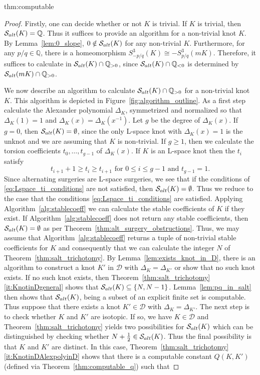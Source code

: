 \documentclass{amsart} %
\newcommand{\D}{\mathcal{D}}
\newcommand{\Q}{\mathbb{Q}}
\newcommand{\Salt}{\mathcal{S}_{\rm alt}}
\theoremstyle{thm}
\theoremstyle{definition}
\numberwithin{equation}{section}
\begin{document}
\begin{repthm}{thm:computable}
   \thmcomputable
\end{repthm}
\begin{proof}
Firstly, one can decide whether or not $K$ is trivial. If $K$ is trivial, then $\Salt(K)=\Q$. Thus it suffices to provide an algorithm for a non-trivial knot $K$. By Lemma~\ref{lem:0_slope}, $0\notin \Salt(K)$ for any non-trivial $K$. Furthermore, for any $p/q\in \Q$, there is a homeomorphism $S_{-p/q}^3(K)\cong -S_{p/q}^3(mK)$. Therefore, it suffices to calculate in $\Salt(K)\cap \Q_{>0}$, since $\Salt(K)\cap \Q_{<0}$ is determined by $\Salt(mK)\cap \Q_{>0}$.

 We now describe an algorithm to calculate $\Salt(K)\cap \Q_{>0}$ for a non-trivial knot $K$. This algorithm is depicted in Figure~\ref{fig:algorithm_outline}. As a first step calculate the Alexander polynomial $\Delta_K$, symmetrized and normalized so that $\Delta_K(1)=1$ and $\Delta_K(x)=\Delta_K(x^{-1})$. Let $g$ be the degree of $\Delta_K(x)$. If $g=0$, then $\Salt(K)=\emptyset$, since the only L-space knot with $\Delta_K(x)=1$ is the unknot and we are assuming that $K$ is non-trivial. If $g\geq 1$, then we calculate the torsion coefficients $t_0, \dots, t_{g-1}$ of $\Delta_K(x)$. If $K$ is an L-space knot then the $t_i$ satisfy
 \begin{equation}\label{eq:Lspace_ti_conditions}
     \text{$t_{i+1}+ 1\geq t_i\geq t_{i+1}$ for $0\leq i\leq g-1$ and $t_{g-1}=1$}.
 \end{equation}
 Since alternating surgeries are L-space surgeries, we see that if the conditions of \eqref{eq:Lspace_ti_conditions} are not satisfied, then $\Salt(K)=\emptyset$. Thus we reduce to the case that the conditions \eqref{eq:Lspace_ti_conditions} are satisfied. Applying Algorithm~\ref{alg:stablecoeff} we can calculate the stable coefficients of $K$ if they exist. If Algorithm~\ref{alg:stablecoeff} does not return any stable coefficients, then $\Salt(K)=\emptyset$ as per Theorem~\ref{thm:alt_surgery_obstructions}. Thus, we may assume that Algorithm~\ref{alg:stablecoeff} returns a tuple of non-trivial stable coefficients for $K$ and consequently that we can calculate the integer $N$ of Theorem~\ref{thm:salt_trichotomy}. By Lemma~\ref{lem:exists_knot_in_D}, there is an algorithm to construct a knot $K'$ in $\D$ with $\Delta_K=\Delta_{K'}$ or show that no such knot exists. If no such knot exists, then Theorem~\ref{thm:salt_trichotomy}\eqref{it:KnotinDgeneral} shows that $\Salt(K)\subseteq\{N,N-1\}$. Lemma~\ref{lem:pq_in_salt} then shows that $\Salt(K)$, being a subset of an explicit finite set is computable. Thus suppose that there exists a knot $K'\in \D$ with $\Delta_K=\Delta_{K'}$. The next step is to check whether $K$ and $K'$ are isotopic. If so, we have $K\in \D$ and Theorem~\ref{thm:salt_trichotomy} yields two possibilities for $\Salt(K)$ which can be distinguished by checking whether $N+\frac12\in\Salt(K)$. Thus the final possibility is that $K$ and $K'$ are distinct. In this case, Theorem~\ref{thm:salt_trichotomy}\eqref{it:KnotinDAlexpolyinD} shows that there is a computable constant $Q(K, K')$ (defined via Theorem~\ref{thm:computable_q}) such that

\end{proof}
\end{document}
